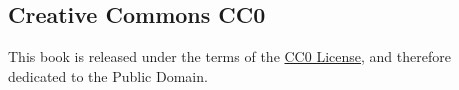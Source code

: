 \subsection{Creative Commons CC0}\label{creative-commons-cc0}

This book is released under the terms of the
\href{http://creativecommons.org/publicdomain/zero/1.0/}{CC0 License},
and therefore dedicated to the Public Domain.
